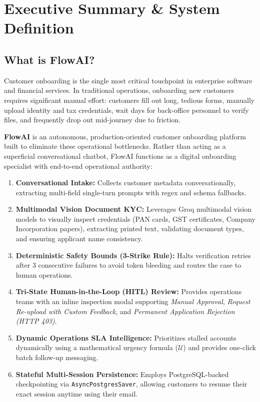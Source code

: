 \documentclass[12pt,a4paper]{article}
\begin{document}
\tableofcontents
\newpage


\section{Executive Summary \& System Definition}

\subsection{What is FlowAI?}
Customer onboarding is the single most critical touchpoint in enterprise software and financial services. In traditional operations, onboarding new customers requires significant manual effort: customers fill out long, tedious forms, manually upload identity and tax credentials, wait days for back-office personnel to verify files, and frequently drop out mid-journey due to friction.

\textbf{FlowAI} is an autonomous, production-oriented customer onboarding platform built to eliminate these operational bottlenecks. Rather than acting as a superficial conversational chatbot, FlowAI functions as a digital onboarding specialist with end-to-end operational authority:
\begin{enumerate}
    \item \textbf{Conversational Intake:} Collects customer metadata conversationally, extracting multi-field single-turn prompts with regex and schema fallbacks.
    \item \textbf{Multimodal Vision Document KYC:} Leverages Groq multimodal vision models to visually inspect credentials (PAN cards, GST certificates, Company Incorporation papers), extracting printed text, validating document types, and ensuring applicant name consistency.
    \item \textbf{Deterministic Safety Bounds (3-Strike Rule):} Halts verification retries after 3 consecutive failures to avoid token bleeding and routes the case to human operations.
    \item \textbf{Tri-State Human-in-the-Loop (HITL) Review:} Provides operations teams with an inline inspection modal supporting \textit{Manual Approval}, \textit{Request Re-upload with Custom Feedback}, and \textit{Permanent Application Rejection (HTTP 403)}.
    \item \textbf{Dynamic Operations SLA Intelligence:} Prioritizes stalled accounts dynamically using a mathematical urgency formula ($\mathcal{U}$) and provides one-click batch follow-up messaging.
    \item \textbf{Stateful Multi-Session Persistence:} Employs PostgreSQL-backed checkpointing via \texttt{AsyncPostgresSaver}, allowing customers to resume their exact session anytime using their email.
\end{enumerate}
\end{document}
